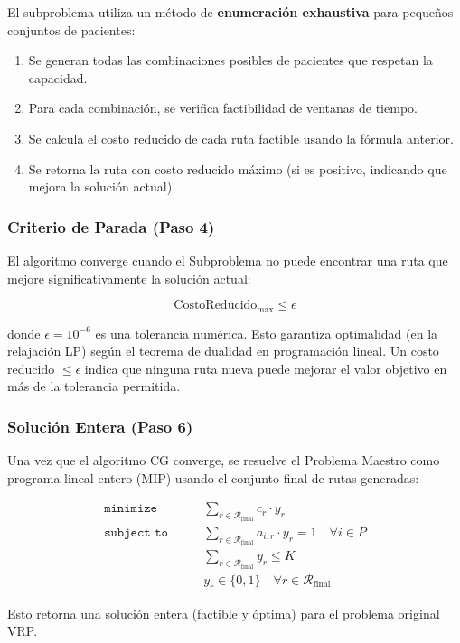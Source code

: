 \documentclass[12pt]{article}
\newcommand{\mini}{\texttt{minimize}\quad\,\,}
\newcommand{\subj}{\texttt{subject to}\quad}
\begin{document}
El subproblema utiliza un método de \textbf{enumeración exhaustiva} para pequeños conjuntos de pacientes:

\begin{enumerate}
    \item Se generan todas las combinaciones posibles de pacientes que respetan la capacidad.
    \item Para cada combinación, se verifica factibilidad de ventanas de tiempo.
    \item Se calcula el costo reducido de cada ruta factible usando la fórmula anterior.
    \item Se retorna la ruta con costo reducido máximo (si es positivo, indicando que mejora la solución actual).
\end{enumerate}

\subsubsection{Criterio de Parada (Paso 4)}

El algoritmo converge cuando el Subproblema no puede encontrar una ruta que mejore significativamente la solución actual:

\[
\text{CostoReducido}_{\max} \leq \epsilon
\]

donde $\epsilon = 10^{-6}$ es una tolerancia numérica. Esto garantiza optimalidad (en la relajación LP) según el teorema de dualidad en programación lineal. Un costo reducido $\leq \epsilon$ indica que ninguna ruta nueva puede mejorar el valor objetivo en más de la tolerancia permitida.

\subsubsection{Solución Entera (Paso 6)}

Una vez que el algoritmo CG converge, se resuelve el Problema Maestro como programa lineal entero (MIP) usando el conjunto final de rutas generadas:

\begin{align*}
  \mini & \sum_{r \in \mathcal{R}_{\text{final}}} c_r \cdot y_r \\
  \subj \quad
    & \sum_{r \in \mathcal{R}_{\text{final}}} a_{i,r} \cdot y_r = 1 \quad \forall i \in P \\
    & \sum_{r \in \mathcal{R}_{\text{final}}} y_r \leq K \\
    & y_r \in \{0,1\} \quad \forall r \in \mathcal{R}_{\text{final}}
\end{align*}

Esto retorna una solución entera (factible y óptima) para el problema original VRP.
\end{document}
